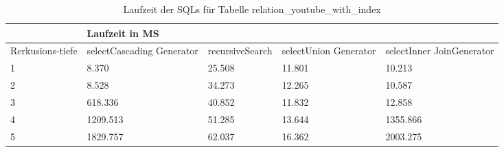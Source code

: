 \begin{table}[H]
	\centering
	\begin{tabular}{l|l|l|l|l|l|}
		\cline{2-6}
		& \multicolumn{5}{|l|}{Laufzeit in MS}                                                                                                                                                  \\ \hline
		\multicolumn{1}{|l|}{\multirow{2}{2cm}{Rerkusions-tiefe}} & \multicolumn{2}{|l|}{\multirow{2}{3cm}{selectCascading Generator}} & \multirow{2}{2.8cm}{recursiveSearch} & \multirow{2}{2.5cm}{selectUnion Generator} & \multirow{2}{2.5cm}{selectInner JoinGenerator} \\
		\multicolumn{1}{|l|}{}
		& \multicolumn{2}{|l|}{}                                           &                                  &                                     &                                           \\ \hline
		
		\multicolumn{1}{|l|}{1}                                 & \multicolumn{2}{l|}{8.370}                                       & 25.508                                                & 11.801                                                    & 10.213                                                          \\ \hline
		\multicolumn{1}{|l|}{2}                                 & \multicolumn{2}{l|}{8.528}                                       & 34.273                                                & 12.265                                                    & 10.587                                                          \\ \hline
		\multicolumn{1}{|l|}{3}                                 & \multicolumn{2}{l|}{618.336}                                     & 40.852                                                & 11.832                                                    & 12.858                                                          \\ \hline
		\multicolumn{1}{|l|}{4}                                 & \multicolumn{2}{l|}{1209.513}                                    & 51.285                                                & 13.644                                                    & 1355.866                                                        \\ \hline
		\multicolumn{1}{|l|}{5}                                 & \multicolumn{2}{l|}{1829.757}                                    & 62.037                                                & 16.362                                                    & 2003.275                                                        \\ \hline
		
		
	\end{tabular}
	\caption{Laufzeit der SQLs für Tabelle relation\_youtube\_with\_index}
	\label{2.relationyoutubeindex.table}
\end{table}

